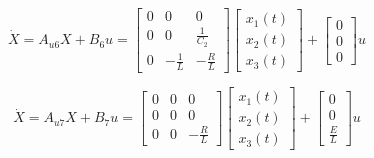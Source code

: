 \begin{equation}
	\dot{X}=A_{u6}X+B_{6}u=
	\left[
		\begin{array}{ccc}
			0&0&0\\
			0&0&\frac{1}{C_2} \\
			0&-\frac{1}{L}&-\frac{R}{L} 
		\end{array}
	\right]
	\left[
		\begin{array}{c}
			x_1(t)\\
			x_2(t)\\
			x_3(t)
		\end{array}
	\right]
	+
	\left[
		\begin{array}{c}
			0\\
			0\\
			0
		\end{array}
	\right]
	u
\end{equation}

\begin{equation}
	\dot{X}=A_{u7}X+B_{7}u=
	\left[
		\begin{array}{ccc}
			0&0&0\\
			0&0&0\\
			0&0&-\frac{R}{L} 
		\end{array}
	\right]
	\left[
		\begin{array}{c}
			x_1(t)\\
			x_2(t)\\
			x_3(t)
		\end{array}
	\right]
	+
	\left[
		\begin{array}{c}
			0\\
			0\\
			\frac{E}{L}
		\end{array}
	\right]
	u
\end{equation}